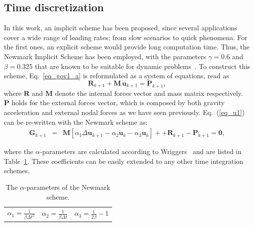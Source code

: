 \documentclass[applsci,journal,article,submit,moreauthors,pdftex]{Definitions/mdpi}
\begin{document}
  \subsection{Time discretization}
  In this work, an implicit scheme has been proposed, since several applications cover a wide range of loading rates; from slow scenarios to quick phenomena. For the first ones, an explicit scheme would provide long computation time. Thus, the Newmark Implicit Scheme has been employed, with the parameters $\gamma=$0.6 and $\beta=$0.325 that are known to be suitable for dynamic problems~\cite{Kontoe2006}. To construct this scheme, Eq.~\eqref{eq_gov1_a} is reformulated as a system of equations, read as
\begin{equation}\label{eq_u1}
 \boldsymbol{ R}_{k+1}  +   \boldsymbol{M}   \, \boldsymbol {\ddot{u}}_{k+1}= \boldsymbol{P }_{k+1},
\end{equation}
where   $\boldsymbol{R}$ and $  \boldsymbol{ M}$  denote the internal forces vector and mass matrix respectively. $\boldsymbol{P}$ holds for the external forces vector, which is composed by both gravity acceleration and external nodal forces as we have seen previously. Eq.~(\ref{eq_u1}) can be re-written with the Newmark scheme as:
\begin{eqnarray}\label{eq_u2}
\boldsymbol {G}_{k+1} &=& \boldsymbol {M}\left[\alpha_1\Delta\boldsymbol {u}_{k+1}-\alpha_2\boldsymbol {\dot{u}}_{k}-\alpha_3\boldsymbol {\ddot{u}}_{k}\right] +
+ \boldsymbol {R}_{k+1}-\boldsymbol {P}_{k+1}=\boldsymbol {0},
\end{eqnarray}

where the $\alpha$-parameters are calculated according to Wriggers~\cite{wriggers:08} and are listed in Table~\ref{tab1}. These coefficients can be easily extended to any other time integration schemes. 
\begin{table}
\caption{\label{tab1} The $\alpha$-parameters of the Newmark scheme.} 
\centering
	\begin{tabular}{lll}
	 $\alpha_1=\frac{1}{\beta\Delta t^2}$ & 	 $\alpha_2=\frac{1}{\beta\Delta t}$ & 
	 $\alpha_3=\frac{1}{2\beta}-1$
	\end{tabular}
\end{table}
\end{document}
